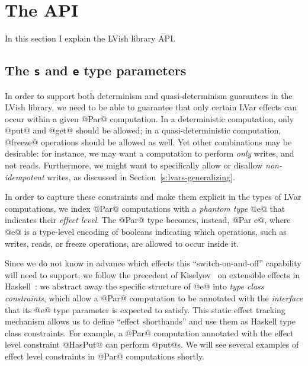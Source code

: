 \section{The API}\label{s:lvish-api}

In this section I explain the LVish library API. 

\subsection{The \lstinline|s| and \lstinline|e| type parameters}

In order to support both determinism and quasi-determinism guarantees
in the LVish library, we need to be able to guarantee that only
certain LVar effects can occur within a given @Par@ computation.  In a
deterministic computation, only @put@ and @get@ should be allowed; in
a quasi-deterministic computation, @freeze@ operations should be
allowed as well.  Yet other combinations may be desirable: for
instance, we may want a computation to perform \emph{only} writes, and
not reads.  Furthermore, we might want to specifically allow or
disallow \emph{non-idempotent} writes, as discussed in
Section~\ref{s:lvars-generalizing}.

In order to capture these constraints and make them explicit in the
types of LVar computations, we index @Par@ computations with a
\emph{phantom type} @e@ that indicates their \emph{effect level}.  The
@Par@ type becomes, instead, @Par e@, where @e@ is a type-level
encoding of booleans indicating which operations, such as writes,
reads, or freeze operations, are allowed to occur inside it.

Since we do not know in advance which effects this
``switch-on-and-off'' capability will need to support, we follow the
precedent of Kiselyov \etal~on extensible effects in
Haskell~\cite{oleg-amr-haskell-2013}: we abstract away the specific
structure of @e@ into \emph{type class constraints}, which allow a
@Par@ computation to be annotated with the \emph{interface} that its
@e@ type parameter is expected to satisfy.  This static effect
tracking mechanism allows us to define ``effect shorthands'' and use
them as Haskell type class constraints.  For example, a @Par@
computation annotated with the effect level constraint @HasPut@ can
perform @put@s.  We will see several examples of effect level
constraints in @Par@ computations shortly.

